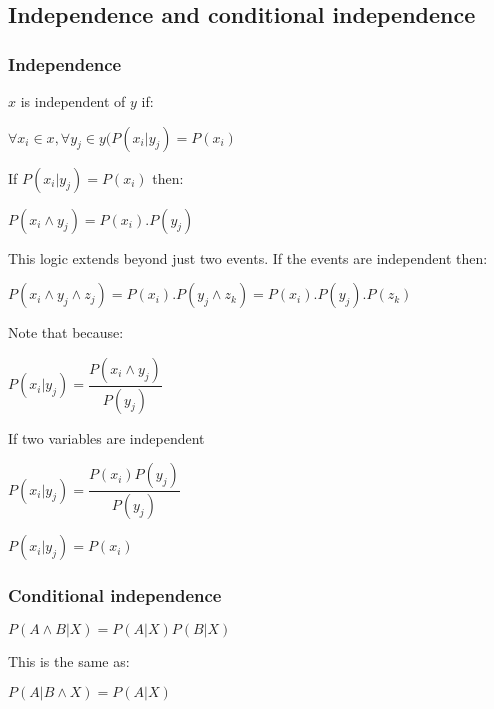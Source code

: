 
\subsection{Independence and conditional independence}

\subsubsection{Independence}

\(x\) is independent of \(y\) if:

\(\forall x_i \in x,\forall y_j \in y (P(x_i|y_j)=P(x_i)\)

If \(P(x_i|y_j)=P(x_i)\) then:

\(P(x_i\land y_j)=P(x_i).P(y_j)\)

This logic extends beyond just two events. If the events are independent then:

\(P(x_i\land y_j \land z_j)=P(x_i).P(y_j \land z_k)=P(x_i).P(y_j).P(z_k)\)

Note that because:

\(P(x_i|y_j)=\dfrac{P(x_i\land y_j)}{P(y_j)}\)

If two variables are independent

\(P(x_i|y_j)=\dfrac{P(x_i)P(y_j)}{P(y_j)}\)

\(P(x_i|y_j)=P(x_i)\)

\subsubsection{Conditional independence}

\(P(A\land B|X)=P(A|X)P(B|X)\)

This is the same as:

\(P(A|B\land X)=P(A|X)\)

